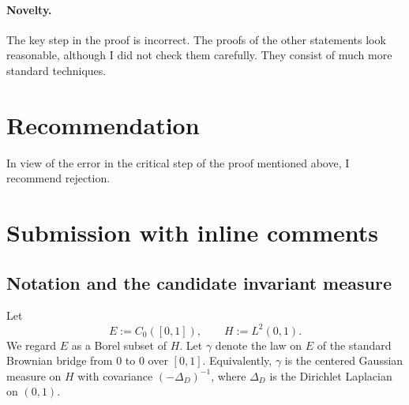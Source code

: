\documentclass[12pt]{article}
\numberwithin{equation}{section}
\newcommand{\dd}{\,\mathrm d}
\newcommand{\1}{\mathbf 1}
\begin{document}
\paragraph{Novelty.}
The key step in the proof is incorrect. The proofs of the other statements look reasonable, although I did not check them carefully. They consist of much more standard techniques.

\section{Recommendation}

  In view of the error in the critical step of the proof mentioned above, I recommend rejection.

  \section{Submission with inline comments}


\date{}

\begin{abstract}
We prove that the Markov semigroup associated with the Dirichlet stochastic heat
equation with drift $\delta_0(u)$ has at most one invariant probability measure.
In fact, under the hypotheses stated in the question, the invariant measure is unique
and is the Gibbs perturbation of the Brownian bridge measure
\[
        \mu(\dd u)=Z^{-1}\exp\!\left(2\int_0^1 \1_{\{u(\xi)>0\}}\dd \xi\right)\gamma(\dd u),
\]
where $\gamma$ is the law of the standard Brownian bridge on $[0,1]$.
The proof uses three inputs: the reversible Gibbs structure of smooth approximations,
the absolute-continuity theorem of Bounebache--Zambotti for the associated
Dirichlet-form resolvent, and irreducibility of the weighted Ornstein--Uhlenbeck
Dirichlet form.
\end{abstract}

\subsection{Notation and the candidate invariant measure}

Let
\[
        E:=C_0([0,1]),\qquad H:=L^2(0,1).
\]
We regard $E$ as a Borel subset of $H$. Let $\gamma$ denote the law on $E$ of the
standard Brownian bridge from $0$ to $0$ over $[0,1]$. Equivalently, $\gamma$ is the
centered Gaussian measure on $H$ with covariance $(-\Delta_D)^{-1}$, where
$\Delta_D$ is the Dirichlet Laplacian on $(0,1)$.
\end{document}
